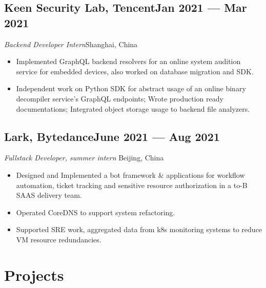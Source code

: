 \documentclass[a4,10pt]{article}
\newcommand{\subtext}[1]{
#1\par\vspace{-0.2cm}}
\newenvironment{zitemize}{
\begin{itemize}\itemsep0pt \parskip0pt \parsep1pt}
{\end{itemize}\vspace{-0.5cm}}
\begin{document}
\subsection*{Keen Security Lab, Tencent\hfill Jan 2021 --- Mar 2021} 
\subtext{\textit{Backend Developer Intern}\hfill Shanghai, China} 
    \begin{zitemize}
        \item Implemented GraphQL backend resolvers for an online system audition service for embedded devices, also worked on database migration and SDK.
        \item Independent work on Python SDK for abstract usage of an online binary decompiler service's GraphQL endpoints; Wrote production ready documentations; Integrated object storage usage to backend file analyzers.
    \end{zitemize}


\subsection*{Lark, Bytedance\hfill June 2021 --- Aug 2021} 
\subtext{\textit{Fullstack Developer, summer intern } \hfill Beijing, China} 
    \begin{zitemize}
        \item Designed and Implemented a bot framework \& applications for workflow automation, ticket tracking and sensitive resource authorization in a to-B SAAS delivery team.
        \item Operated CoreDNS to support system refactoring.
        \item Supported SRE work, aggregated data from k8s monitoring systems to reduce VM resource redundancies. 
    \end{zitemize}





\section{Projects} %
\end{document}
